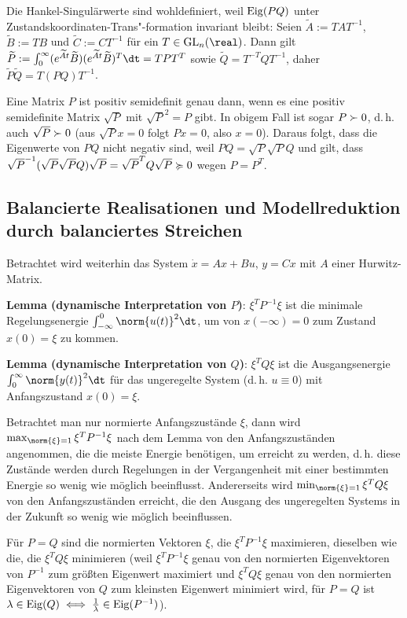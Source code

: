 Die Hankel-Singulärwerte sind wohldefiniert, weil $\operatorname{Eig}(PQ)$ unter
Zustandskoordinaten-Trans"-formation invariant bleibt:
Seien $\widetilde{A} := TAT^{-1}$, $\widetilde{B} := TB$ und $\widetilde{C} := CT^{-1}$ für
ein $T \in \GL_n(\real)$.
Dann gilt $\widetilde{P} := \int_0^\infty (e^{\widetilde{A} t} \widetilde{B})
(e^{\widetilde{A} t} \widetilde{B})^T \dt
= TPT^T$ sowie $\widetilde{Q} = T^{-T} Q T^{-1}$,
daher $\widetilde{P} \widetilde{Q} = T(PQ)T^{-1}$.

Eine Matrix $P$ ist positiv semidefinit genau dann, wenn es
eine positiv semidefinite Matrix $\sqrt{P}$ mit $\sqrt{P}^2 = P$ gibt.
In obigem Fall ist sogar $P \succ 0$, d.\,h. auch $\sqrt{P} \succ 0$
(aus $\sqrt{P}x = 0$ folgt $Px = 0$, also $x = 0$).
Daraus folgt, dass die Eigenwerte von $PQ$ nicht negativ sind, weil $PQ = \sqrt{P} \sqrt{P} Q$
und gilt, dass $\sqrt{P}^{-1} (\sqrt{P} \sqrt{P} Q) \sqrt{P} = \sqrt{P}^T Q \sqrt{P} \succcurlyeq 0$ wegen
$P = P^T$.

\pagebreak

\subsection{%
    Balancierte Realisationen und Modellreduktion durch balanciertes Streichen%
}

Betrachtet wird weiterhin das System $\dot{x} = Ax + Bu$, $y = Cx$ mit $A$ einer Hurwitz-Matrix.

\textbf{Lemma (dynamische Interpretation von $P$)}:
$\xi^T P^{-1} \xi$ ist die minimale Regelungsenergie $\int_{-\infty}^0 \norm{u(t)}^2 \dt$,
um von $x(-\infty) = 0$ zum Zustand $x(0) = \xi$ zu kommen.

\textbf{Lemma (dynamische Interpretation von $Q$)}:
$\xi^T Q \xi$ ist die Ausgangsenergie $\int_0^\infty \norm{y(t)}^2 \dt$
für das ungeregelte System (d.\,h. $u \equiv 0$) mit Anfangszustand $x(0) = \xi$.

Betrachtet man nur normierte Anfangszustände $\xi$,
dann wird $\max_{\norm{\xi}=1} \xi^T P^{-1} \xi$ nach dem Lemma von den Anfangszuständen
angenommen, die die meiste Energie benötigen, um erreicht zu werden,
d.\,h. diese Zustände werden durch Regelungen in der Vergangenheit mit einer bestimmten Energie
so wenig wie möglich beeinflusst.
Andererseits wird $\min_{\norm{\xi}=1} \xi^T Q\xi$ von den Anfangszuständen
erreicht, die den Ausgang des ungeregelten Systems in der Zukunft so wenig wie möglich
beeinflussen.

Für $P = Q$ sind die normierten Vektoren $\xi$, die $\xi^T P^{-1} \xi$ maximieren,
dieselben wie die, die $\xi^T Q\xi$ minimieren
(weil $\xi^T P^{-1} \xi$ genau von den normierten Eigenvektoren von $P^{-1}$ zum größten Eigenwert
maximiert und $\xi^T Q\xi$ genau von den normierten Eigenvektoren von $Q$ zum kleinsten
Eigenwert minimiert wird,
für $P = Q$ ist $\lambda \in \operatorname{Eig}(Q) \iff \frac{1}{\lambda} \in \operatorname{Eig}(P^{-1})$).

